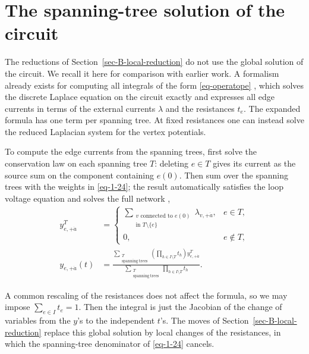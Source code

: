 \documentclass[11pt]{article}
\numberwithin{equation}{section}
\numberwithin{figure}{section}
\numberwithin{table}{section}
\begin{document}
\section{The spanning-tree solution of the circuit}\label{sec-B-spanning}

The reductions of Section~\ref{sec-B-local-reduction} do not use the global solution of the circuit. We recall it here for comparison with earlier work. A formalism already exists for computing all integrals of the form \eqref{eq-operatope} \cite[Theorem 4 and Corollary 2]{Wang}, which solves the discrete Laplace equation on the circuit exactly and expresses all edge currents in terms of the external currents $\lambda$ and the resistances $t_e$. The expanded formula has one term per spanning tree. At fixed resistances one can instead solve the reduced Laplacian system for the vertex potentials.

To compute the edge currents from the spanning trees, first solve the conservation law on each spanning tree $T$: deleting $e\in T$ gives its current as the source sum on the component containing $e(0)$. Then sum over the spanning trees with the weights in \eqref{eq-1-24}; the result automatically satisfies the loop voltage equation and solves the full network \cite{Wang},
\begin{equation}\label{eq-1-24}
\begin{aligned}
y^T_{e,+\dot a}
&=\begin{cases}
\displaystyle\sum_{\substack{v\text{ connected to }e(0)\\
\text{in }T\setminus\{e\}}}\lambda_{v,+\dot a},&e\in T,\\[3pt]
0,&e\notin T,
\end{cases}\\[4pt]
y_{e,+\dot a}(t)
&=\frac{\displaystyle\sum_{\substack{T\\\mathrm{spanning\ trees}}}
\left(\prod_{h\in I\setminus T}t_h\right)y^T_{e,+\dot a}}
{\displaystyle\sum_{\substack{T\\\mathrm{spanning\ trees}}}\prod_{h\in I\setminus T}t_h}.
\end{aligned}
\end{equation}

A common rescaling of the resistances does not affect the formula, so we may impose $\sum_{e\in I}t_e=1$. Then the integral is just the Jacobian of the change of variables from the $y$'s to the independent $t$'s. The moves of Section~\ref{sec-B-local-reduction} replace this global solution by local changes of the resistances, in which the spanning-tree denominator of \eqref{eq-1-24} cancels.
\end{document}
